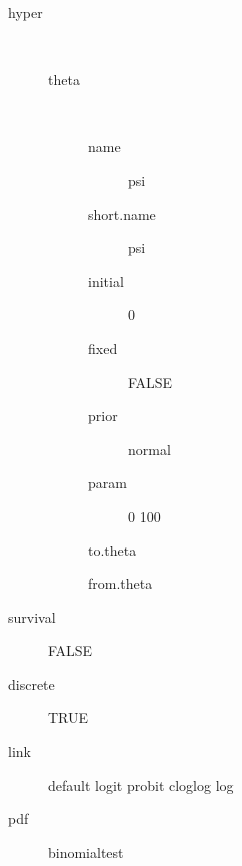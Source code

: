 \begin{description}
	\item[hyper]\ 
	 \begin{description}
	 	\item[theta]\ 
	 	 \begin{description}
	 	 	 \item[ name ] psi 
	 	 	 \item[ short.name ] psi 
	 	 	 \item[ initial ] 0 
	 	 	 \item[ fixed ] FALSE 
	 	 	 \item[ prior ] normal 
	 	 	 \item[ param ] 0 100 
	 	 	 \item[ to.theta ] \verb|| 
	 	 	 \item[ from.theta ] \verb|| 
	 	 \end{description}
	 \end{description}
	 \item[ survival ] FALSE 
	 \item[ discrete ] TRUE 
	 \item[ link ] default logit probit cloglog log 
	 \item[ pdf ] binomialtest 
\end{description}
